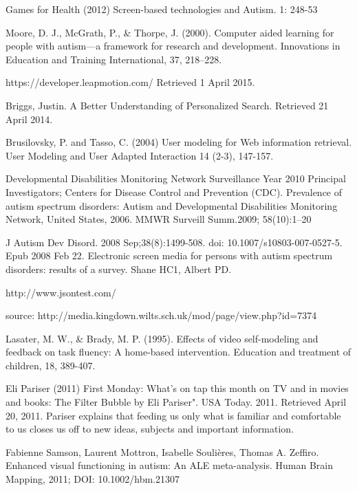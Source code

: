\documentclass[10pt]{article}
\begin{document}
\begin{thebibliography}{100}

 Games for Health (2012) Screen-based technologies and Autism. 1: 248-53

Moore, D. J., McGrath, P., \& Thorpe, J. (2000). Computer aided learning for people with autism—a framework for research and development. Innovations in Education and Training International, 37, 218–228.

 https://developer.leapmotion.com/ Retrieved 1 April 2015.

Briggs, Justin. A Better Understanding of Personalized Search. Retrieved 21 April 2014.

Brusilovsky, P. and Tasso, C. (2004) User modeling for Web information retrieval. User Modeling and User Adapted Interaction 14 (2-3), 147-157.


Developmental Disabilities Monitoring Network Surveillance Year 2010 Principal Investigators; Centers for Disease Control and Prevention (CDC). Prevalence of autism spectrum disorders: Autism and Developmental Disabilities Monitoring Network, United States, 2006. MMWR Surveill Summ.2009; 58(10):1–20


J Autism Dev Disord. 2008 Sep;38(8):1499-508. doi: 10.1007/s10803-007-0527-5. Epub 2008 Feb 22. Electronic screen media for persons with autism spectrum disorders: results of a survey.
Shane HC1, Albert PD.

http://www.jsontest.com/

source: http://media.kingdown.wilts.sch.uk/mod/page/view.php?id=7374

Lasater, M. W., \& Brady, M. P. (1995). Effects of video self-modeling and feedback on task fluency: A home-based intervention. Education and treatment of children, 18, 389-407.


Eli Pariser (2011) First Monday: What's on tap this month on TV and in movies and books: The Filter Bubble by Eli Pariser". USA Today. 2011. Retrieved April 20, 2011. Pariser explains that feeding us only what is familiar and comfortable to us closes us off to new ideas, subjects and important information.

Fabienne Samson, Laurent Mottron, Isabelle Soulières, Thomas A. Zeffiro. Enhanced visual functioning in autism: An ALE meta-analysis. Human Brain Mapping, 2011; DOI: 10.1002/hbm.21307


\end{thebibliography}
\end{document}
